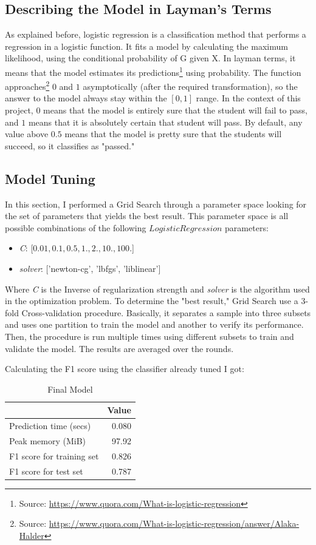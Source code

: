 \documentclass[a4paper]{article}
\begin{document}
\subsection{Describing the Model in Layman’s Terms}
As explained before, logistic regression is a classification method that performs a regression in a logistic function. It fits a model by calculating the maximum likelihood, using the conditional probability of G given X. In layman terms, it means that the model estimates its predictions\footnote{Source: \url{https://www.quora.com/What-is-logistic-regression}} using probability. The function approaches\footnote{Source: \url{https://www.quora.com/What-is-logistic-regression/answer/Alaka-Halder}} $0$ and $1$ asymptotically (after the required transformation), so the answer to the model always stay within the $[0,1]$ range. In the context of this project, $0$ means that the model is entirely sure that the student will fail to pass, and $1$ means that it is absolutely certain that student will pass. By default, any value above $0.5$ means that the model is pretty sure that the students will succeed, so it classifies as "passed."

\subsection{Model Tuning}
In this section, I performed a Grid Search through a parameter space looking for the set of parameters that yields the best result. This parameter space is all possible combinations of the following $Logistic Regression$ parameters:
\begin{itemize}
\item \textit{C}: [$0.01, 0.1, 0.5, 1., 2., 10., 100.$]
\item \textit{solver}: ['newton-cg', 'lbfgs', 'liblinear'] 
\end{itemize}

Where \textit{C} is the Inverse of regularization strength and \textit{solver} is the algorithm used in the optimization problem. To determine the "best result," Grid Search use a 3-fold Cross-validation procedure. Basically, it separates a sample into three subsets and uses one partition to train the model and another to verify its performance. Then, the procedure is run multiple times using different subsets to train and validate the model. The results are averaged over the rounds.

Calculating the F1 score using the classifier already tuned I got:

\begin{table}[ht]
\centering
\begin{tabular}{l|r}
 & Value \\\hline
Prediction time (secs) & 0.080 \\
Peak memory (MiB) & 97.92 \\
F1 score for training set & 0.826 \\
F1 score for test set & 0.787 \\
\end{tabular}
\caption{\label{tab:finalmodel}Final Model}
\end{table}
\end{document}
